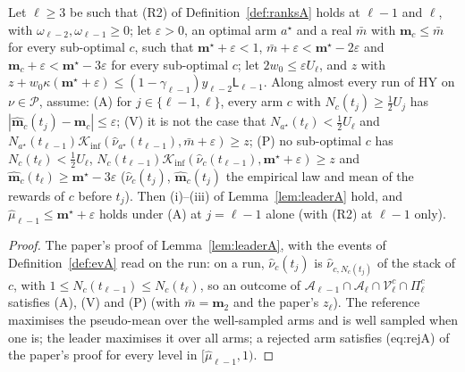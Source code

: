 \documentclass[11pt]{article}
\newcommand{\Kinf}{\mathcal K_{\inf}}
\newcommand{\cP}{\mathcal P}
\begin{document}
\begin{lemma}\label{flem:leaderA-run}
Let $\ell\ge3$ be such that (R2) of Definition~\ref{def:ranksA} holds at $\ell-1$ and $\ell$,
with $\omega_{\ell-2},\omega_{\ell-1}\ge0$; let $\varepsilon>0$, an optimal arm $a^\star$ and
a real $\bar m$ with $\mathbf m_c\le\bar m$ for every sub-optimal $c$, such that
$\mathbf m^\star+\varepsilon<1$, $\bar m+\varepsilon<\mathbf m^\star-2\varepsilon$ and
$\mathbf m_c+\varepsilon<\mathbf m^\star-3\varepsilon$ for every sub-optimal $c$; let
$2w_0\le\varepsilon U_\ell$, and $z$ with
$z+w_0\kappa(\mathbf m^\star+\varepsilon)\le(1-\gamma_{\ell-1})y_{\ell-2}\mathsf L_{\ell-1}$.
Along almost every run of HY on $\nu\in\cP$, assume:
(A) for $j\in\{\ell-1,\ell\}$, every arm $c$ with $N_c(t_j)\ge\frac12U_j$ has
$|\hat{\mathbf m}_c(t_j)-\mathbf m_c|\le\varepsilon$;
(V) it is not the case that $N_{a^\star}(t_\ell)<\frac12U_\ell$ and
$N_{a^\star}(t_{\ell-1})\Kinf(\hat\nu_{a^\star}(t_{\ell-1}),\bar m+\varepsilon)\ge z$;
(P) no sub-optimal $c$ has $N_c(t_\ell)<\frac12U_\ell$,
$N_c(t_{\ell-1})\Kinf(\hat\nu_c(t_{\ell-1}),\mathbf m^\star+\varepsilon)\ge z$ and
$\hat{\mathbf m}_c(t_\ell)\ge\mathbf m^\star-3\varepsilon$
($\hat\nu_c(t_j)$, $\hat{\mathbf m}_c(t_j)$ the empirical law and mean of the rewards of $c$
before $t_j$). Then (i)--(iii) of Lemma~\ref{lem:leaderA} hold, and
$\hat\mu_{\ell-1}\le\mathbf m^\star+\varepsilon$ holds under (A) at $j=\ell-1$ alone (with
(R2) at $\ell-1$ only).
\end{lemma}

\begin{proof}
The paper's proof of Lemma~\ref{lem:leaderA}, with the events of Definition~\ref{def:evA} read on
the run: on a run, $\hat\nu_c(t_j)$ is $\hat\nu_{c,N_c(t_j)}$ of the stack of $c$, with
$1\le N_c(t_{\ell-1})\le N_c(t_\ell)$, so an outcome of
$\mathcal A_{\ell-1}\cap\mathcal A_\ell\cap\mathcal V_\ell^c\cap\Pi_\ell^c$ satisfies (A), (V)
and (P) (with $\bar m=\mathbf m_2$ and the paper's $z_\ell$). The reference maximises the
pseudo-mean over the well-sampled arms and is well sampled when one is; the leader maximises it
over all arms; a rejected arm satisfies (eq:rejA) of the paper's proof for every level in
$[\hat\mu_{\ell-1},1)$.
\end{proof}
\end{document}
